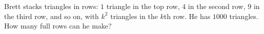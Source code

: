 Brett stacks triangles in rows: $1$ triangle in the top row, $4$ in the second row, $9$ in the third row, and so on, with $k^2$ triangles in the $k$th row. He has $1000$ triangles. How many full rows can he make?
